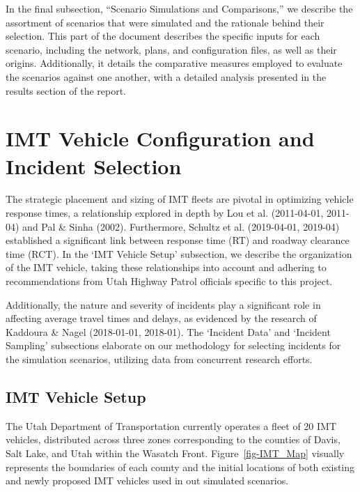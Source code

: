 \documentclass[fancy, oneside, mastersfancy, ms]{byuthesis}
\begin{document}
In the final subsection, ``Scenario Simulations and Comparisons,'' we
describe the assortment of scenarios that were simulated and the
rationale behind their selection. This part of the document describes
the specific inputs for each scenario, including the network, plans, and
configuration files, as well as their origins. Additionally, it details
the comparative measures employed to evaluate the scenarios against one
another, with a detailed analysis presented in the results section of
the report.

\hypertarget{imt-vehicle-configuration-and-incident-selection}{%
\section{IMT Vehicle Configuration and Incident
Selection}\label{imt-vehicle-configuration-and-incident-selection}}

The strategic placement and sizing of IMT fleets are pivotal in
optimizing vehicle response times, a relationship explored in depth by
Lou et al. (2011-04-01, 2011-04) and Pal \& Sinha (2002). Furthermore,
Schultz et al. (2019-04-01, 2019-04) established a significant link
between response time (RT) and roadway clearance time (RCT). In the `IMT
Vehicle Setup' subsection, we describe the organization of the IMT
vehicle, taking these relationships into account and adhering to
recommendations from Utah Highway Patrol officials specific to this
project.

Additionally, the nature and severity of incidents play a significant
role in affecting average travel times and delays, as evidenced by the
research of Kaddoura \& Nagel (2018-01-01, 2018-01). The `Incident Data'
and `Incident Sampling' subsections elaborate on our methodology for
selecting incidents for the simulation scenarios, utilizing data from
concurrent research efforts.

\hypertarget{imt-vehicle-setup}{%
\subsection{IMT Vehicle Setup}\label{imt-vehicle-setup}}

The Utah Department of Transportation currently operates a fleet of 20
IMT vehicles, distributed across three zones corresponding to the
counties of Davis, Salt Lake, and Utah within the Wasatch Front.
Figure~\ref{fig-IMT_Map} visually represents the boundaries of each
county and the initial locations of both existing and newly proposed IMT
vehicles used in out simulated scenarios.
\end{document}
